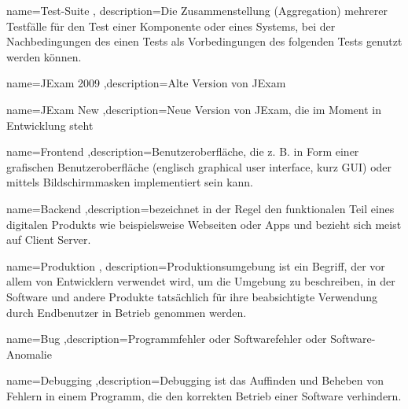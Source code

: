 {name=Test-Suite , description={Die Zusammenstellung (Aggregation) mehrerer Testf\"alle f\"ur den Test einer Komponente oder eines Systems, bei der Nachbedingungen des einen Tests als Vorbedingungen des folgenden Tests genutzt werden k\"onnen.}}

{name=JExam 2009 ,description={Alte Version von JExam}}

{name=JExam New ,description={Neue Version von JExam, die im Moment in Entwicklung steht}}

{name=Frontend ,description={Benutzeroberfläche, die z. B. in Form einer grafischen Benutzeroberfläche (englisch graphical user interface, kurz GUI) oder mittels Bildschirmmasken implementiert sein kann.}}

{name=Backend ,description={bezeichnet in der Regel den funktionalen Teil eines digitalen Produkts wie beispielsweise Webseiten oder Apps und bezieht sich meist auf Client Server.}}

{name=Produktion , description={Produktionsumgebung ist ein Begriff, der vor allem von Entwicklern verwendet wird, um die Umgebung zu beschreiben, in der Software und andere Produkte tatsächlich für ihre beabsichtigte Verwendung durch Endbenutzer in Betrieb genommen werden.}}

{name=Bug ,description={Programmfehler oder Softwarefehler oder Software-Anomalie}}

{name=Debugging ,description={Debugging ist das Auffinden und Beheben von Fehlern in einem Programm, die den korrekten Betrieb einer Software verhindern.}}